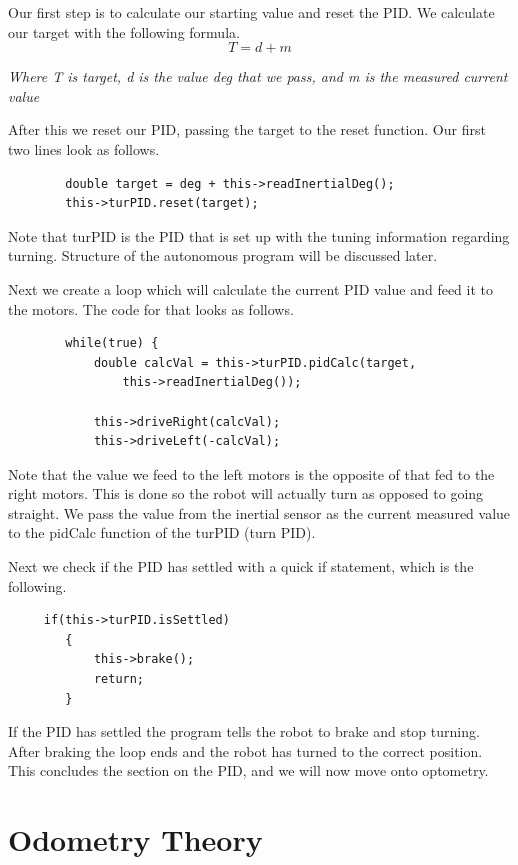 \documentclass[12pt]{report}
\begin{document}
    Our first step is to calculate our starting value and reset the PID. We calculate our target with the following formula.
    $$ T = d + m $$
    \begin{center}
     \em{Where T is target, d is the value deg that we pass, and m is the measured current value}
    \end{center}

    After this we reset our PID, passing the target to the reset function.
    Our first two lines look as follows.

    \begin{verbatim}
        double target = deg + this->readInertialDeg();
        this->turPID.reset(target);
    \end{verbatim}

    Note that turPID is the PID that is set up with the tuning information regarding turning.
    Structure of the autonomous program will be discussed later.

    Next we create a loop which will calculate the current PID value and feed it to the motors.
    The code for that looks as follows.

    \begin{verbatim}
        while(true) {
            double calcVal = this->turPID.pidCalc(target,
                this->readInertialDeg());

            this->driveRight(calcVal);
            this->driveLeft(-calcVal);
    \end{verbatim}

    Note that the value we feed to the left motors is the opposite of that fed to the right motors.
    This is done so the robot will actually turn as opposed to going straight.
    We pass the value from the inertial sensor as the current measured value to the pidCalc function of the turPID (turn PID).

    Next we check if the PID has settled with a quick if statement, which is the following.
    \begin{verbatim}
     if(this->turPID.isSettled)
        {
            this->brake();
            return;
        }
    \end{verbatim}

    If the PID has settled the program tells the robot to brake and stop turning.
    After braking the loop ends and the robot has turned to the correct position.
    This concludes the section on the PID, and we will now move onto optometry.


\pagebreak
\chapter{Odometry Theory}
\end{document}
